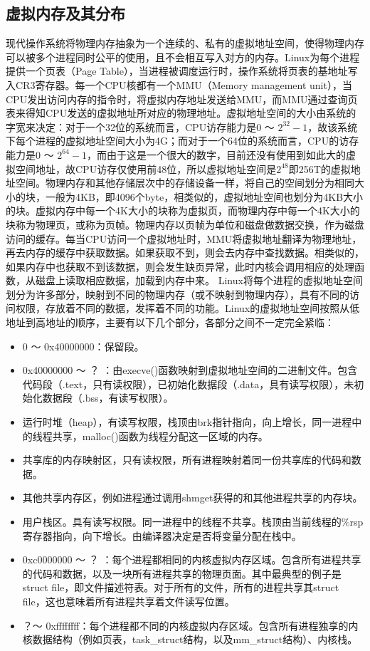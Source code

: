 \subsection{虚拟内存及其分布}
现代操作系统将物理内存抽象为一个连续的、私有的虚拟地址空间，使得物理内存可以被多个进程同时公平的使用，且不会相互写入对方的内存。Linux为每个进程提供一个页表（Page Table），当进程被调度运行时，操作系统将页表的基地址写入CR3寄存器。每一个CPU核都有一个MMU（Memory management unit），当CPU发出访问内存的指令时，将虚拟内存地址发送给MMU，而MMU通过查询页表来得知CPU发送的虚拟地址所对应的物理地址。虚拟地址空间的大小由系统的字宽来决定：对于一个32位的系统而言，CPU访存能力是0 ～ $2^{32}-1$，故该系统下每个进程的虚拟地址空间大小为4G；而对于一个64位的系统而言，CPU的访存能力是0 ～ $2^{64}-1$，而由于这是一个很大的数字，目前还没有使用到如此大的虚拟空间地址，故CPU访存仅使用前48位，所以虚拟地址空间是$2^{48}$即256T的虚拟地址空间。物理内存和其他存储层次中的存储设备一样，将自己的空间划分为相同大小的块，一般为4KB，即4096个byte，相类似的，虚拟地址空间也划分为4KB大小的块。虚拟内存中每一个4K大小的块称为虚拟页，而物理内存中每一个4K大小的块称为物理页，或称为页帧。物理内存以页帧为单位和磁盘做数据交换，作为磁盘访问的缓存。每当CPU访问一个虚拟地址时，MMU将虚拟地址翻译为物理地址，再去内存的缓存中获取数据。如果获取不到，则会去内存中查找数据。相类似的，如果内存中也获取不到该数据，则会发生缺页异常，此时内核会调用相应的处理函数，从磁盘上读取相应数据，加载到内存中来。
\label{chap:mem}
Linux将每个进程的虚拟地址空间划分为许多部分，映射到不同的物理内存（或不映射到物理内存），具有不同的访问权限，存放着不同的数据，发挥着不同的功能。Linux的虚拟地址空间按照从低地址到高地址的顺序，主要有以下几个部分，各部分之间不一定完全紧临：
\begin{itemize}
  \item 0 ～ 0x40000000：保留段。
  \item 0x40000000 ～ ？ ：由execve()函数映射到虚拟地址空间的二进制文件。包含代码段（.text，只有读权限），已初始化数据段（.data，具有读写权限），未初始化数据段（.bss，有读写权限）。
  \item 运行时堆（heap），有读写权限，栈顶由brk指针指向，向上增长，同一进程中的线程共享，malloc()函数为线程分配这一区域的内存。
  \item 共享库的内存映射区，只有读权限，所有进程映射着同一份共享库的代码和数据。
  \item 其他共享内存区，例如进程通过调用shmget获得的和其他进程共享的内存块。
  \item 用户栈区。具有读写权限。同一进程中的线程不共享。栈顶由当前线程的\%rsp寄存器指向，向下增长。由编译器决定是否将变量分配在栈中。
  \item 0xc0000000 ～ ？ ：每个进程都相同的内核虚拟内存区域。包含所有进程共享的代码和数据，以及一块所有进程共享的物理页面。其中最典型的例子是struct file，即文件描述符表。对于所有的文件，所有的进程共享其struct file，这也意味着所有进程共享着文件读写位置。
  \item ？～ 0xffffffff：每个进程都不同的内核虚拟内存区域。包含所有进程独享的内核数据结构（例如页表，task\_struct结构，以及mm\_struct结构）、内核栈。
\end{itemize}
